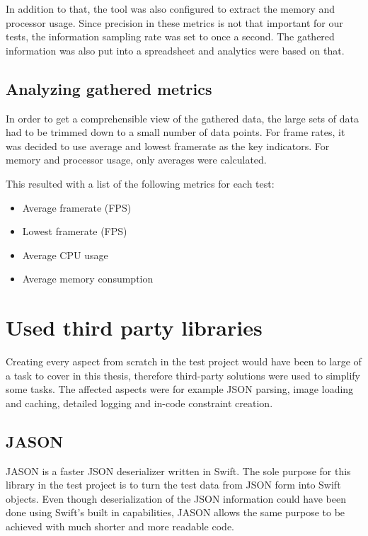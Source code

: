 \documentclass[a4paper,12pt]{article}
\begin{document}
In addition to that, the tool was also configured to extract the memory and processor usage. Since precision in these metrics is not that important for our tests, the information sampling rate was set to once a second. The gathered information was also put into a spreadsheet and analytics were based on that.

\subsection{Analyzing gathered metrics}
In order to get a comprehensible view of the gathered data, the large sets of data had to be trimmed down to a small number of data points. For frame rates, it was decided to use average and lowest framerate as the key indicators. For memory and processor usage, only averages were calculated.

This resulted with a list of the following metrics for each test:
\begin{itemize}
  \item Average framerate (FPS)
  \item Lowest framerate (FPS)
  \item Average CPU usage
  \item Average memory consumption
\end{itemize}

\newpage
\section{Used third party libraries}
Creating every aspect from scratch in the test project would have been to large of a task to cover in this thesis, therefore third-party solutions were used to simplify some tasks. The affected aspects were for example JSON parsing, image loading and caching, detailed logging and in-code constraint creation.

\subsection{JASON}
JASON is a faster JSON deserializer written in Swift.\cite{JASON} The sole purpose for this library in the test project is to turn the test data from JSON form into Swift objects. Even though deserialization of the JSON information could have been done using Swift's built in capabilities, JASON allows the same purpose to be achieved with much shorter and more readable code.
\end{document}
